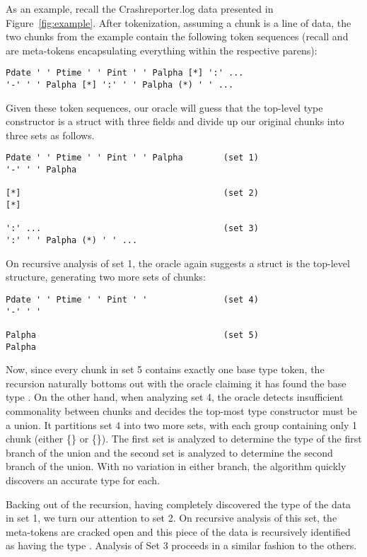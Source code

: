 As an example, recall the Crashreporter.log data presented in
Figure~\ref{fig:example}.  After tokenization, assuming a chunk is
a line of data, the two chunks from the example contain the following 
token sequences (recall \cd{[*]} and \cd{(*)} are meta-tokens encapsulating
everything within the respective parens):
{\small
\begin{verbatim}
Pdate ' ' Ptime ' ' Pint ' ' Palpha [*] ':' ...
'-' ' ' Palpha [*] ':' ' ' Palpha (*) ' ' ...
\end{verbatim}
}
\noindent
Given these token sequences, 
our oracle will guess that the top-level type constructor is a struct 
with three fields and divide up our original chunks into three sets
as follows.
{\small
\begin{verbatim}
Pdate ' ' Ptime ' ' Pint ' ' Palpha        (set 1)       
'-' ' ' Palpha 

[*]                                        (set 2)       
[*]

':' ...                                    (set 3)       
':' ' ' Palpha (*) ' ' ...
\end{verbatim}
}
\noindent
On recursive analysis of set 1, the oracle again suggests a struct is the top-level structure,
generating two more sets of chunks: 
{\small
\begin{verbatim}
Pdate ' ' Ptime ' ' Pint ' '               (set 4)       
'-' ' '

Palpha                                     (set 5)       
Palpha 
\end{verbatim}
}
\noindent
Now, since every chunk in set 5 contains exactly one base type
token, the recursion naturally bottoms out with the oracle claiming it has
found the base type .  On the other hand, when analyzing set 4, 
the oracle detects insufficient commonality between chunks and decides
the top-most type constructor must be a union. It partitions set 4 into
two more sets, with each group containing only 1 chunk (either
\{\} or \{\}).  The first set is analyzed to 
determine the type of the first branch of the union and the second set 
is analyzed to determine the second branch of the union.
With no variation in either branch,
the algorithm quickly discovers an accurate type for each.

Backing out of the recursion, having completely discovered the
type of the data in set 1, we turn our attention to set 2.
On recursive analysis of this set, the meta-tokens are cracked open
and this piece of the data is recursively identified as having the type 
.  Analysis of Set 3 proceeds in a similar 
fashion to the others.

